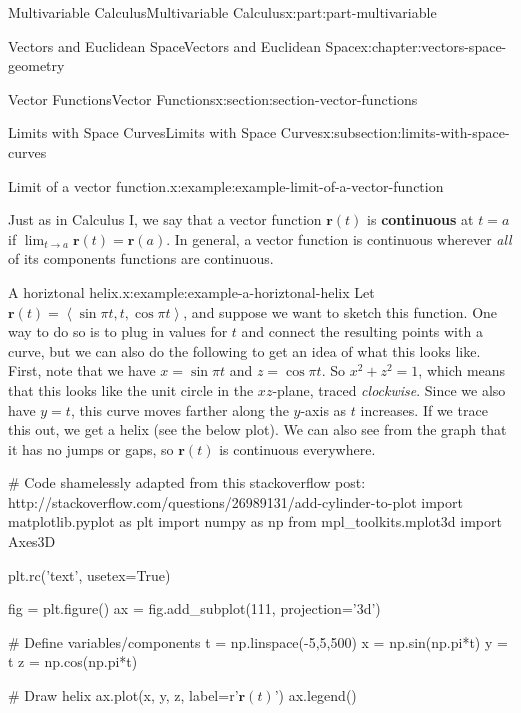 \documentclass[twoside,10pt,]{book}
\newcommand{\terminology}[1]{\textbf{#1}}
\numberwithin{equation}{part}
\newcommand{\dotprod}[1]{\left\langle #1 \right\rangle}
\begin{document}
\begin{partptx}{Multivariable Calculus}{}{Multivariable Calculus}{}{}{x:part:part-multivariable}
\begin{chapterptx}{Vectors and Euclidean Space}{}{Vectors and Euclidean Space}{}{}{x:chapter:vectors-space-geometry}
\begin{sectionptx}{Vector Functions}{}{Vector Functions}{}{}{x:section:section-vector-functions}
\begin{subsectionptx}{Limits with Space Curves}{}{Limits with Space Curves}{}{}{x:subsection:limits-with-space-curves}
\begin{example}{Limit of a vector function.}{x:example:example-limit-of-a-vector-function}
\end{example}
Just as in Calculus I, we say that a vector function \(\mathbf{r}(t)\) is \terminology{continuous} at \(t=a\) if \(\lim_{t\to a}\mathbf{r}(t) = \mathbf{r}(a)\). In general, a vector function is continuous wherever \emph{all} of its components functions are continuous.%
\begin{example}{A horiztonal helix.}{x:example:example-a-horiztonal-helix}%
Let \(\mathbf{r}(t) = \dotprod{\sin\pi t, t, \cos\pi t}\), and suppose we want to sketch this function. One way to do so is to plug in values for \(t\) and connect the resulting points with a curve, but we can also do the following to get an idea of what this looks like. First, note that we have \(x = \sin\pi t\) and \(z=\cos\pi t\). So \(x^{2}+z^{2} = 1\), which means that this looks like the unit circle in the \(xz\)-plane, traced \emph{clockwise}. Since we also have \(y=t\), this curve moves farther along the \(y\)-axis as \(t\) increases. If we trace this out, we get a helix (see the below plot). We can also see from the graph that it has no jumps or gaps, so \(\mathbf{r}(t)\) is continuous everywhere.%
\end{example}
\begin{sageinput}
# Code shamelessly adapted from this stackoverflow post: http://stackoverflow.com/questions/26989131/add-cylinder-to-plot
import matplotlib.pyplot as plt
import numpy as np
from mpl_toolkits.mplot3d import Axes3D

plt.rc('text', usetex=True)

fig = plt.figure()
ax = fig.add_subplot(111, projection='3d')

# Define variables/components
t = np.linspace(-5,5,500)
x = np.sin(np.pi*t)
y = t
z = np.cos(np.pi*t)

# Draw helix
ax.plot(x, y, z, label=r'$\mathbf{r}(t)$')
ax.legend()


\end{sageinput}
\end{subsectionptx}
\end{sectionptx}
\end{chapterptx}
\end{partptx}
\end{document}
